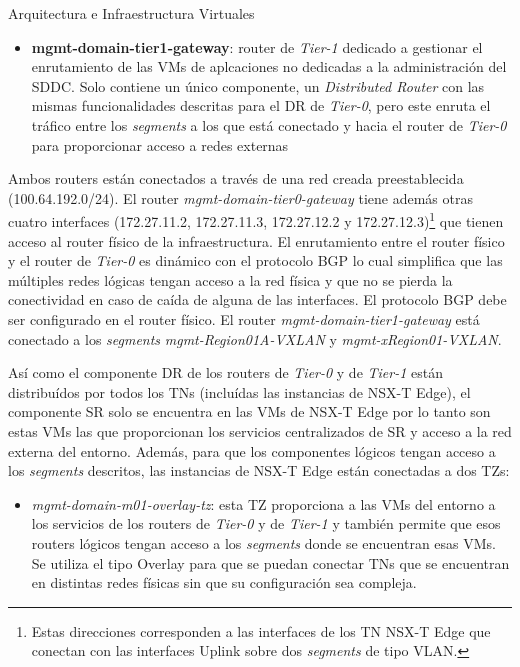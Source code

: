 \begin{subsection}{Arquitectura e Infraestructura Virtuales\cite{CFVirtInfraes}}
\begin{itemize}
\begin{itemize}
    \end{itemize}

    \item \textbf{mgmt-domain-tier1-gateway}: router de \textit{Tier-1} dedicado a gestionar el enrutamiento de las VMs de aplcaciones no dedicadas a la administración del SDDC. Solo contiene un único componente, un \textit{Distributed Router} con las mismas funcionalidades descritas para el DR de \textit{Tier-0}, pero este enruta el tráfico entre los \textit{segments} a los que está conectado y hacia el router de \textit{Tier-0} para proporcionar acceso a redes externas
  \end{itemize}
Ambos routers están conectados a través de una red creada preestablecida (100.64.192.0/24). El router \textit{mgmt-domain-tier0-gateway} tiene además otras cuatro interfaces (172.27.11.2, 172.27.11.3, 172.27.12.2 y 172.27.12.3)\footnote{Estas direcciones corresponden a las interfaces de los TN NSX-T Edge que conectan con las interfaces Uplink sobre dos \textit{segments} de tipo VLAN.} que tienen acceso al router físico de la infraestructura. El enrutamiento entre el router físico y el router de \textit{Tier-0} es dinámico con el protocolo BGP lo cual simplifica que las múltiples redes lógicas tengan acceso a la red física y que no se pierda la conectividad en caso de caída de alguna de las interfaces. El protocolo BGP debe ser configurado en el router físico. El router \textit{mgmt-domain-tier1-gateway} está conectado a los \textit{segments} \textit{mgmt-Region01A-VXLAN} y \textit{mgmt-xRegion01-VXLAN}.

Así como el componente DR de los routers de \textit{Tier-0} y de \textit{Tier-1} están distribuídos por todos los TNs (incluídas las instancias de NSX-T Edge), el componente SR solo se encuentra en las VMs de NSX-T Edge por lo tanto son estas VMs las que proporcionan los servicios centralizados de SR y acceso a la red externa del entorno. Además, para que los componentes lógicos tengan acceso a los \textit{segments} descritos, las instancias de NSX-T Edge están conectadas a dos TZs:
\begin{itemize}
  
  \item \textit{mgmt-domain-m01-overlay-tz}: esta TZ proporciona a las VMs del entorno a los servicios de los routers de \textit{Tier-0} y de \textit{Tier-1} y también permite que esos routers lógicos tengan acceso a los \textit{segments} donde se encuentran esas VMs. Se utiliza el tipo Overlay para que se puedan conectar TNs que se encuentran en distintas redes físicas sin que su configuración sea compleja.
  

\end{itemize}
\end{subsection}
